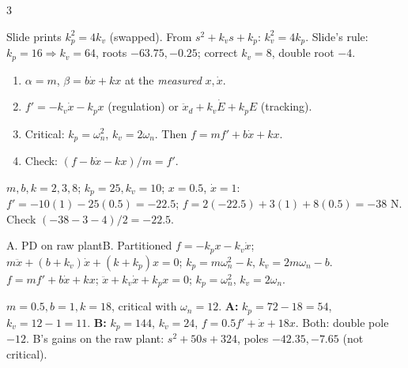 \begin{multicols}{3}
\begin{slideerr}
Slide prints $k_p^2=4k_v$ (swapped). From $s^2+k_vs+k_p$: $k_v^2=4k_p$. Slide's rule: $k_p{=}16\Rightarrow k_v{=}64$, roots $-63.75,-0.25$; correct $k_v{=}8$, double root $-4$. \chk
\end{slideerr}
\begin{recipe}
\begin{enumerate}
\item $\alpha=m$, $\beta=b\dot x+kx$ at the \emph{measured} $x,\dot x$.
\item $f'=-k_v\dot x-k_px$ (regulation) or $\ddot x_d+k_v\dot E+k_pE$ (tracking).
\item Critical: $k_p=\omega_n^2$, $k_v=2\omega_n$. Then $f=mf'+b\dot x+kx$.
\item Check: $(f-b\dot x-kx)/m=f'$.
\end{enumerate}
\end{recipe}
\begin{worked}
$m,b,k{=}2,3,8$; $k_p{=}25,k_v{=}10$; $x{=}0.5$, $\dot x{=}1$: $f'=-10(1)-25(0.5)=-22.5$; $f=2(-22.5)+3(1)+8(0.5)=-38$ N. Check $(-38-3-4)/2=-22.5$. \chk
\end{worked}
\begin{twoway}{A. PD on raw plant}{B. Partitioned}
$f=-k_px-k_v\dot x$; $m\ddot x+(b{+}k_v)\dot x+(k{+}k_p)x=0$; $k_p=m\omega_n^2-k$, $k_v=2m\omega_n-b$.
\tcblower
$f=mf'+b\dot x+kx$; $\ddot x+k_v\dot x+k_px=0$; $k_p=\omega_n^2$, $k_v=2\omega_n$.
\end{twoway}
\begin{worked}
$m{=}0.5,b{=}1,k{=}18$, critical with $\omega_n{=}12$. \textbf{A:} $k_p=72-18=54$, $k_v=12-1=11$. \textbf{B:} $k_p=144$, $k_v=24$, $f=0.5f'+\dot x+18x$. Both: double pole $-12$. B's gains on the raw plant: $s^2+50s+324$, poles $-42.35,-7.65$ (not critical). \chk
\end{worked}


\end{multicols}
